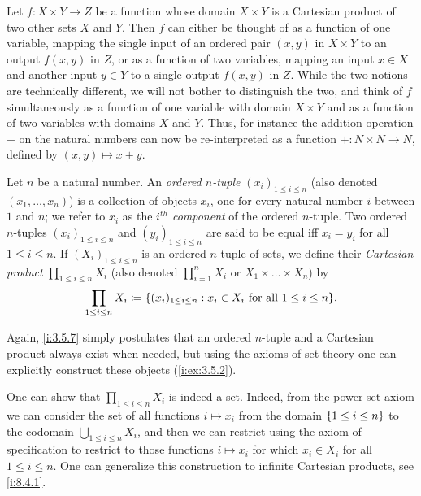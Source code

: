\begin{note}
  Let \(f : X \times Y \to Z\) be a function whose domain \(X \times Y\) is a Cartesian product of two other sets \(X\) and \(Y\).
  Then \(f\) can either be thought of as a function of one variable, mapping the single input of an ordered pair \((x, y)\) in \(X \times Y\) to an output \(f(x, y)\) in \(Z\), or as a function of two variables, mapping an input \(x \in X\) and another input \(y \in Y\) to a single output \(f(x, y)\) in \(Z\).
  While the two notions are technically different, we will not bother to distinguish the two, and think of \(f\) simultaneously as a function of one variable with domain \(X \times Y\) and as a function of two variables with domains \(X\) and \(Y\).
  Thus, for instance the addition operation \(+\) on the natural numbers can now be re-interpreted as a function \(+ : N \times N \to N\), defined by \((x, y) \mapsto x + y\).
\end{note}

\setcounter{thm}{6}
\begin{defn}\label{i:3.5.7}
  Let \(n\) be a natural number.
  An \emph{ordered \(n\)-tuple} \((x_i)_{1 \leq i \leq n}\) (also denoted \((x_1, \dots, x_n)\)) is a collection of objects \(x_i\), one for every natural number \(i\) between \(1\) and \(n\);
  we refer to \(x_i\) as the \emph{\(i^{th}\) component} of the ordered \(n\)-tuple.
  Two ordered \(n\)-tuples \((x_i)_{1 \leq i \leq n}\) and \((y_i)_{1 \leq i \leq n}\) are said to be equal iff \(x_i = y_i\) for all \(1 \leq i \leq n\).
  If \((X_i)_{1 \leq i \leq n}\) is an ordered \(n\)-tuple of sets, we define their \emph{Cartesian product} \(\prod_{1 \leq i \leq n} X_i\) (also denoted \(\prod_{i=1}^n X_i\) or \(X_1 \times \dots \times X_n\)) by
  \[
    \prod_{1 \leq i \leq n} X_i \coloneqq \set{(x_i)_{1 \leq i \leq n} : x_i \in X_i \text{ for all } 1 \leq i \leq n}.
  \]
\end{defn}

\begin{note}
  Again, \cref{i:3.5.7} simply postulates that an ordered \(n\)-tuple and a Cartesian product always exist when needed, but using the axioms of set theory one can explicitly construct these objects (\cref{i:ex:3.5.2}).
\end{note}

\begin{rmk}\label{i:3.5.8}
  One can show that \(\prod_{1 \leq i \leq n} X_i\) is indeed a set.
  Indeed, from the power set axiom we can consider the set of all functions \(i \mapsto x_i\) from the domain \(\left\lbrace1 \leq i \leq n\right\rbrace\) to the codomain \(\bigcup_{1 \leq i \leq n} X_i\), and then we can restrict using the axiom of specification to restrict to those functions \(i \mapsto x_i\) for which \(x_i \in X_i\) for all \(1 \leq i \leq n\).
  One can generalize this construction to infinite Cartesian products, see \cref{i:8.4.1}.
\end{rmk}

